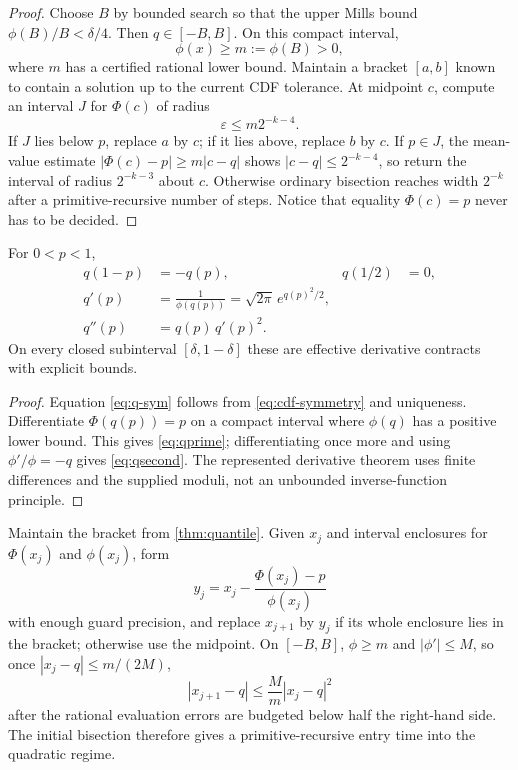 \begin{proof}
Choose $B$ by bounded search so that the upper Mills bound $\phi(B)/B<\delta/4$.  Then $q\in[-B,B]$.  On this compact interval,
\[
 \phi(x)\ge m:=\phi(B)>0,
\]
where $m$ has a certified rational lower bound.  Maintain a bracket $[a,b]$ known to contain a solution up to the current CDF tolerance.  At midpoint $c$, compute an interval $J$ for $\Phi(c)$ of radius
\[
 \varepsilon\le m2^{-k-4}.
\]
If $J$ lies below $p$, replace $a$ by $c$; if it lies above, replace $b$ by $c$.  If $p\in J$, the mean-value estimate
$|\Phi(c)-p|\ge m|c-q|$ shows $|c-q|\le2^{-k-4}$, so return the interval of radius $2^{-k-3}$ about $c$.  Otherwise ordinary bisection reaches width $2^{-k}$ after a primitive-recursive number of steps.  Notice that equality $\Phi(c)=p$ never has to be decided.
\end{proof}

\begin{corollary}\label{cor:quantile-ode}
For $0<p<1$,
\begin{align}
 q(1-p)&=-q(p), & q(1/2)&=0,\label{eq:q-sym}\\
 q'(p)&=\frac1{\phi(q(p))}=\sqrt{2\pi}\,e^{q(p)^2/2},\label{eq:qprime}\\
 q''(p)&=q(p)\,q'(p)^2.\label{eq:qsecond}
\end{align}
On every closed subinterval $[\delta,1-\delta]$ these are effective derivative contracts with explicit bounds.
\end{corollary}

\begin{proof}
Equation \eqref{eq:q-sym} follows from \eqref{eq:cdf-symmetry} and uniqueness.  Differentiate $\Phi(q(p))=p$ on a compact interval where $\phi(q)$ has a positive lower bound.  This gives \eqref{eq:qprime}; differentiating once more and using $\phi'/\phi=-q$ gives \eqref{eq:qsecond}.  The represented derivative theorem uses finite differences and the supplied moduli, not an unbounded inverse-function principle.
\end{proof}

\begin{algorithm}\label{alg:newton}
Maintain the bracket from \cref{thm:quantile}.  Given $x_j$ and interval enclosures for $\Phi(x_j)$ and $\phi(x_j)$, form
\[
 y_j=x_j-\frac{\Phi(x_j)-p}{\phi(x_j)}
\]
with enough guard precision, and replace $x_{j+1}$ by $y_j$ if its whole enclosure lies in the bracket; otherwise use the midpoint.  On $[-B,B]$, $\phi\ge m$ and $|\phi'|\le M$, so once $|x_j-q|\le m/(2M)$,
\[
 |x_{j+1}-q|\le \frac{M}{m}|x_j-q|^2
\]
after the rational evaluation errors are budgeted below half the right-hand side.  The initial bisection therefore gives a primitive-recursive entry time into the quadratic regime.
\end{algorithm}
